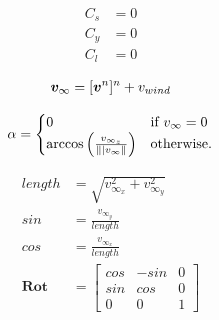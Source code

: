\begin{equation}
    \begin{split}
        C_s &= 0 \\
        C_y &= 0 \\
        C_l &= 0
    \end{split}
\end{equation}

\begin{align}
    \bm v_\infty = [\bm v^n]^n + v_{wind}
\end{align}

\begin{align}
		\alpha = 
    		 \begin{cases} 
        		 0 & \text{if $v_\infty = 0$} \\
        		 \arccos \left( \frac{ v_{\infty_z}}{\norm{\mid v_\infty}} \right) & \text{otherwise.}
    		 \end{cases}
\end{align}

\begin{equation}
    \begin{split}
        length &= \sqrt{v_{\infty_x}^2 + v_{\infty_y}^2} \\
        sin &= \frac{v_{\infty_y}}{length} \\
        cos &= \frac{v_{\infty_x}}{length} \\
        \mathbf{Rot} &= 
        \begin{bmatrix}
            cos & -sin & 0 \\
            sin & cos & 0 \\
            0 & 0 & 1
        \end{bmatrix}
    \end{split}
\end{equation}